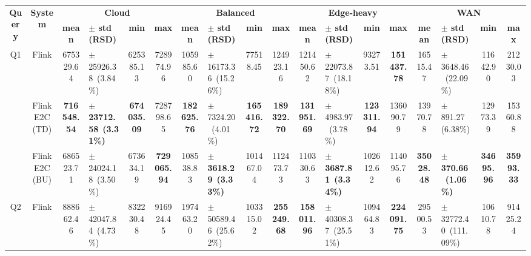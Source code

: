 \begin{tabular}{@{} c c c l c c c l c c c l c c c l c c @{}}
  \toprule
  \multirow{2}{*}{\textbf{Query}} & \multirow{2}{*}{\textbf{System}} & \multicolumn{4}{c}{\textbf{Cloud}} & \multicolumn{4}{c}{\textbf{Balanced}} & \multicolumn{4}{c}{\textbf{Edge-heavy}} & \multicolumn{4}{c}{\textbf{WAN}} \\
  \cmidrule(lr){3-6} \cmidrule(lr){7-10} \cmidrule(lr){11-14} \cmidrule(lr){15-18}
   &  & \textbf{mean} & \multicolumn{1}{l}{\textbf{$\pm$ std (RSD)}} & \textbf{min} & \textbf{max} & \textbf{mean} & \multicolumn{1}{l}{\textbf{$\pm$ std (RSD)}} & \textbf{min} & \textbf{max} & \textbf{mean} & \multicolumn{1}{l}{\textbf{$\pm$ std (RSD)}} & \textbf{min} & \textbf{max} & \textbf{mean} & \multicolumn{1}{l}{\textbf{$\pm$ std (RSD)}} & \textbf{min} & \textbf{max} \\
  \midrule
  \multirow{3}{*}{Q1} & Flink & \num{675329.64} & $\pm$ \num{25926.38}~(\num{3.84}\%) & \num{625385.13} & \num{728974.96} & \num{105985.60} & $\pm$ \num{16173.36}~(\num{15.26}\%) & \num{77518.45} & \num{124923.16} & \num{121450.62} & $\pm$ \num{22073.87}~(\num{18.18}\%) & \num{93273.51} & {\bfseries \num{151437.78}} & \num{16515.47} & $\pm$ \num{3648.46}~(\num{22.09}\%) & \num{11642.90} & \num{21230.03} \\
   & FlinkE2C (TD) & {\bfseries \num{716548.54}} & $\pm$ {\bfseries \num{23712.58}}~{\bfseries (\num{3.31}\%)} & {\bfseries \num{674035.09}} & \num{728798.65} & {\bfseries \num{182625.76}} & $\pm$ \num{7324.20}~(\num{4.01}\%) & {\bfseries \num{165416.72}} & {\bfseries \num{189322.70}} & {\bfseries \num{131951.69}} & $\pm$ \num{4983.97}~(\num{3.78}\%) & {\bfseries \num{123311.94}} & \num{136090.79} & \num{13970.78} & $\pm$ \num{891.27}~(\num{6.38}\%) & \num{12973.39} & \num{15360.88} \\
   & FlinkE2C (BU) & \num{686523.71} & $\pm$ \num{24024.18}~(\num{3.50}\%) & \num{673634.19} & {\bfseries \num{729065.94}} & \num{108538.83} & $\pm$ {\bfseries \num{3618.29}}~{\bfseries (\num{3.33}\%)} & \num{101467.04} & \num{112473.73} & \num{110330.63} & $\pm$ {\bfseries \num{3687.81}}~{\bfseries (\num{3.34}\%)} & \num{102612.62} & \num{114095.76} & {\bfseries \num{35028.48}} & $\pm$ {\bfseries \num{370.66}}~{\bfseries (\num{1.06}\%)} & {\bfseries \num{34695.96}} & {\bfseries \num{35993.33}} \\
  \cmidrule(lr){1-18}
  \multirow{3}{*}{Q2} & Flink & \num{888662.46} & $\pm$ \num{42047.84}~(\num{4.73}\%) & \num{832230.48} & \num{916924.45} & \num{197463.20} & $\pm$ \num{50589.46}~(\num{25.62}\%) & \num{103315.02} & {\bfseries \num{255249.68}} & {\bfseries \num{158011.96}} & $\pm$ \num{40308.37}~(\num{25.51}\%) & \num{109464.83} & {\bfseries \num{224091.75}} & \num{29500.53} & $\pm$ \num{32772.40}~(\num{111.09}\%) & \num{10610.78} & \num{91425.24} \\

\end{tabular}
